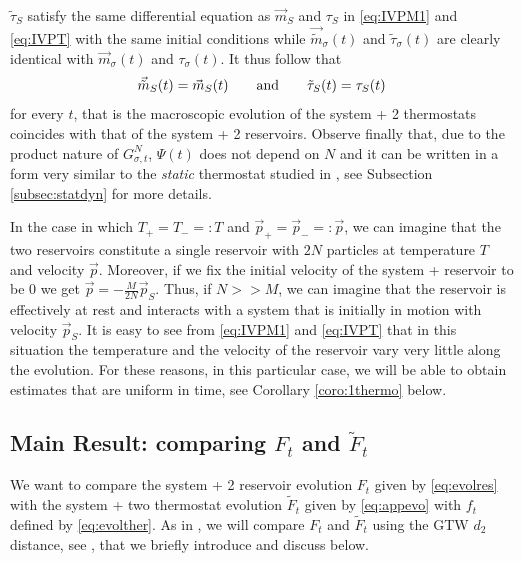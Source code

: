 \documentclass{article}
\begin{document}
$\tilde\tau_S$ satisfy the same differential equation as $\vec{m}_S$ and $\tau_S$ in \eqref{eq:IVPM1} and
\eqref{eq:IVPT} with the same initial conditions while $\vec{\tilde m}_\sigma(t)$ and $\tilde \tau_\sigma(t)$ are
clearly identical with $\vec{m}_\sigma(t)$ and $\tau_\sigma(t)$. It thus follow that
\[
\vec{\tilde m}_S(t)=\vec{m}_S(t)\qquad\hbox{and}\qquad\tilde\tau_S(t)=\tau_S(t)
\]
for every $t$, that is the macroscopic evolution of the system + 2 thermostats coincides with that of the system + 2 
reservoirs. Observe finally that, due to the product nature of $G^N_{\sigma,t}$, $\Psi(t)$ does not depend on $N$ and 
it can be written in a form very similar to the {\it static} thermostat studied in \cite{BLV,BLTV,BLP25}, see 
Subsection \ref{subsec:statdyn} for more details.

In the case in which $T_+=T_-=:T$ and $\vec p_+=\vec p_-=:\vec p$, we can imagine that the two reservoirs constitute a
single reservoir with $2N$ particles at temperature $T$ and velocity $\vec p$. Moreover, if we fix the initial velocity
of the system + reservoir to be 0 we get $\vec p=-\frac{M}{2N}\vec p_S$. Thus, if $N>>M$, we can imagine that the
reservoir is effectively at rest and interacts with a system that is initially in motion with velocity $\vec p_S$. It is
easy to see from \eqref{eq:IVPM1} and \eqref{eq:IVPT} that in this situation the temperature and the velocity of the
reservoir vary very little along the evolution. For these reasons, in this particular case, we will be able to obtain
estimates that are uniform in time, see Corollary \ref{coro:1thermo} below.


\subsection{Main Result: comparing $F_t$ and $\widetilde F_t$}\label{subsec:main}

We want to compare the system + 2 reservoir evolution $F_t$ given by \eqref{eq:evolres} with the system + two thermostat
evolution $\widetilde F_t$ given by \eqref{eq:appevo} with $f_t$ defined by \eqref{eq:evolther}. As in \cite{BLP25}, we
will compare $F_t$ and $\widetilde F_t$ using the GTW $d_2$ distance, see \cite{GTW}, that we briefly introduce and 
discuss below. 
\end{document}

